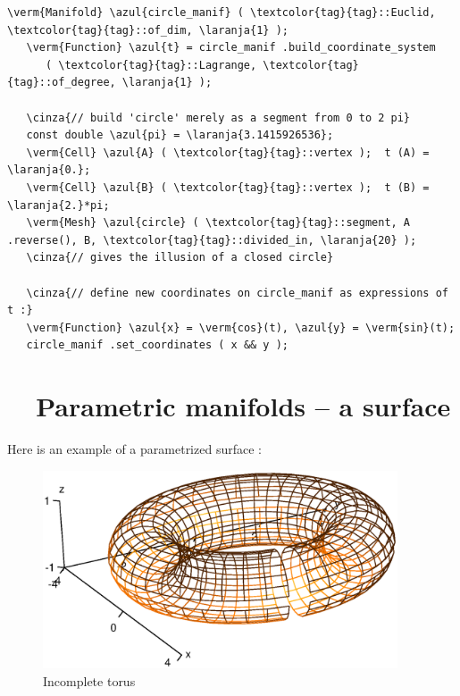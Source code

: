 \begin{Verbatim}[commandchars=\\\{\},formatcom=\small\tt,baselinestretch=0.94]
   \verm{Manifold} \azul{circle_manif} ( \textcolor{tag}{tag}::Euclid, \textcolor{tag}{tag}::of_dim, \laranja{1} );
   \verm{Function} \azul{t} = circle_manif .build_coordinate_system
      ( \textcolor{tag}{tag}::Lagrange, \textcolor{tag}{tag}::of_degree, \laranja{1} );

   \cinza{// build 'circle' merely as a segment from 0 to 2 pi}
   const double \azul{pi} = \laranja{3.1415926536};
   \verm{Cell} \azul{A} ( \textcolor{tag}{tag}::vertex );  t (A) = \laranja{0.};
   \verm{Cell} \azul{B} ( \textcolor{tag}{tag}::vertex );  t (B) = \laranja{2.}*pi;
   \verm{Mesh} \azul{circle} ( \textcolor{tag}{tag}::segment, A .reverse(), B, \textcolor{tag}{tag}::divided_in, \laranja{20} );
   \cinza{// gives the illusion of a closed circle}

   \cinza{// define new coordinates on circle_manif as expressions of t :}
   \verm{Function} \azul{x} = \verm{cos}(t), \azul{y} = \verm{sin}(t);
   circle_manif .set_coordinates ( x && y );
\end{Verbatim}


\section{~~Parametric manifolds -- a surface}\label{\numb section 2.\numb parag 16}

Here is an example of a parametrized surface :

\begin{figure}[ht] \centering
  \includegraphics[width=105mm]{torus}
  \caption{Incomplete torus}
\end{figure}

